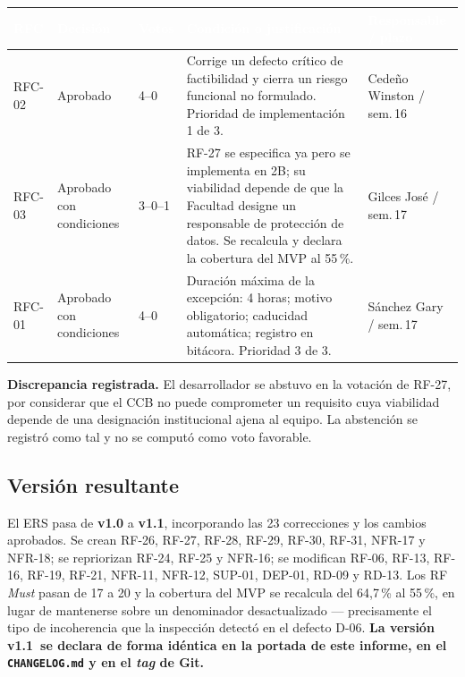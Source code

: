 \documentclass[11pt,letterpaper]{article}
\newcommand{\versionbase}{v1.1}
\newcommand{\thead}[1]{\cellcolor{uteqverde}\textcolor{white}{\textbf{#1}}}
\begin{document}
\begin{center}
\small
\begin{tabular}{|p{1.2cm}|p{2.9cm}|p{1.3cm}|p{6.4cm}|p{2.6cm}|}
\hline
\thead{RFC} & \thead{Decisión} & \thead{Votos} & \thead{Condición o justificación} & \thead{Responsable / plazo} \\ \hline
RFC-02 & Aprobado & 4--0 & Corrige un defecto crítico de factibilidad y cierra un riesgo funcional no formulado. Prioridad de implementación 1 de 3. & Cedeño Winston / sem.\,16 \\ \hline
RFC-03 & Aprobado con condiciones & 3--0--1 & RF-27 se especifica ya pero se implementa en 2B; su viabilidad depende de que la Facultad designe un responsable de protección de datos. Se recalcula y declara la cobertura del MVP al 55\,\%. & Gilces José / sem.\,17 \\ \hline
RFC-01 & Aprobado con condiciones & 4--0 & Duración máxima de la excepción: 4 horas; motivo obligatorio; caducidad automática; registro en bitácora. Prioridad 3 de 3. & Sánchez Gary / sem.\,17 \\ \hline
\end{tabular}
\end{center}

\textbf{Discrepancia registrada.} El desarrollador se abstuvo en la votación de RF-27, por considerar que el CCB no puede comprometer un requisito cuya viabilidad depende de una designación institucional ajena al equipo. La abstención se registró como tal y no se computó como voto favorable.

\subsection{Versión resultante}
El ERS pasa de \textbf{v1.0} a \textbf{\versionbase}, incorporando las 23 correcciones y los cambios aprobados. Se crean RF-26, RF-27, RF-28, RF-29, RF-30, RF-31, NFR-17 y NFR-18; se repriorizan RF-24, RF-25 y NFR-16; se modifican RF-06, RF-13, RF-16, RF-19, RF-21, NFR-11, NFR-12, SUP-01, DEP-01, RD-09 y RD-13. Los RF \emph{Must} pasan de 17 a 20 y la cobertura del MVP se recalcula del 64,7\,\% al 55\,\%, en lugar de mantenerse sobre un denominador desactualizado --- precisamente el tipo de incoherencia que la inspección detectó en el defecto D-06. \textbf{La versión \versionbase\ se declara de forma idéntica en la portada de este informe, en el \texttt{CHANGELOG.md} y en el \emph{tag} de Git.}

\end{document}
